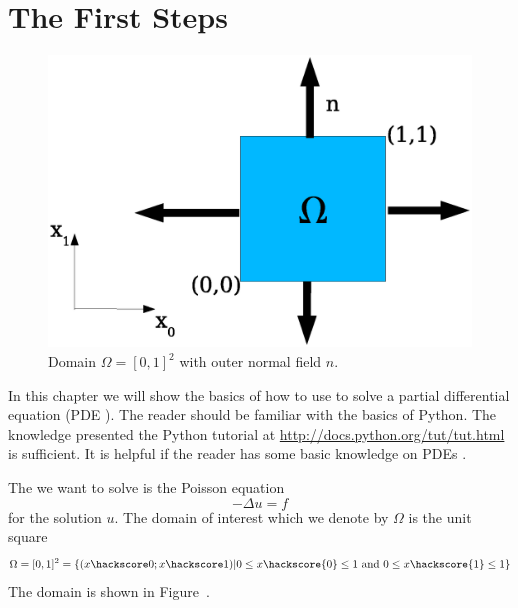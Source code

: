 
\chapter{The First Steps}
\label{FirstSteps} 

\begin{figure}
\centerline{\includegraphics[width=\figwidth]{FirstStepDomain}}
\caption{Domain $\Omega=[0,1]^2$ with outer normal field $n$.}
\label{fig:FirstSteps.1}
\end{figure}

In this chapter we will show the basics of how to use \escript to solve 
a partial differential equation  (PDE ). The reader should be familiar with
the basics of Python. The knowledge presented the Python tutorial at \url{http://docs.python.org/tut/tut.html}
is sufficient. It is helpful if the reader has some basic knowledge on PDEs .

The  we want to solve is the Poisson equation  
\begin{equation}
-\Delta u =f 
\label{eq:FirstSteps.1}
\end{equation}
for the solution $u$. The domain of interest which we denote by $\Omega$
is the unit square 
\begin{equation}
\Omega=[0,1]^2=\{ (x\hackscore 0;x\hackscore 1) | 0\le x\hackscore{0} \le 1 \mbox{ and } 0\le x\hackscore{1} \le 1 \}
\label{eq:FirstSteps.1b}
\end{equation}
The domain is shown in Figure~.


